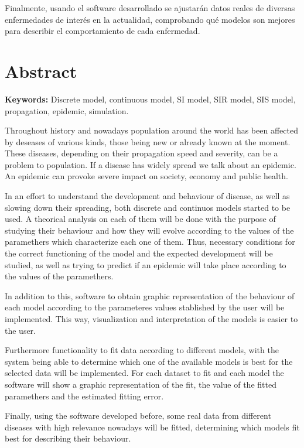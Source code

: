 Finalmente, usando el software desarrollado se ajustarán datos reales de diversas enfermedades de interés en la actualidad, comprobando qué modelos son mejores para describir el comportamiento de cada enfermedad.



\chapter*{Abstract}

\textbf{Keywords: } Discrete model, continuous model, SI model, SIR model, SIS model, propagation, epidemic, simulation.

Throughout history and nowadays population around the world has been affected by deseases of various kinds, those being new or already known at the moment. These diseases, depending on their propagation speed and severity, can be a problem to population. If a disease has widely spread we talk about an epidemic. An epidemic can provoke severe impact on society, economy and public health.

In an effort to understand the development and behaviour of disease, as well as slowing down their spreading, both discrete and continuos models started to be used. A theorical analysis on each of them will be done with the purpose of studying their behaviour and how they will evolve according to the values of the paramethers which characterize each one of them. Thus, necessary conditions for the correct functioning of the model and the expected development will be studied, as well as trying to predict if an epidemic will take place according to the values of the paramethers.

In addition to this, software  to obtain graphic representation of the behaviour of each model according to the parameteres values stablished by the user will be implemented. This way, visualization and interpretation of the models is easier to the user.

Furthermore functionality to fit data according to different models, with the system being able to determine which one of the available models is best for the selected data will be implemented. For each dataset to fit and each model the software will show a graphic representation of the fit, the value of the fitted paramethers and the estimated fitting error.

Finally, using the software developed before, some real data from different diseases with high relevance nowadays will be fitted, determining which models fit best for describing their behaviour.

